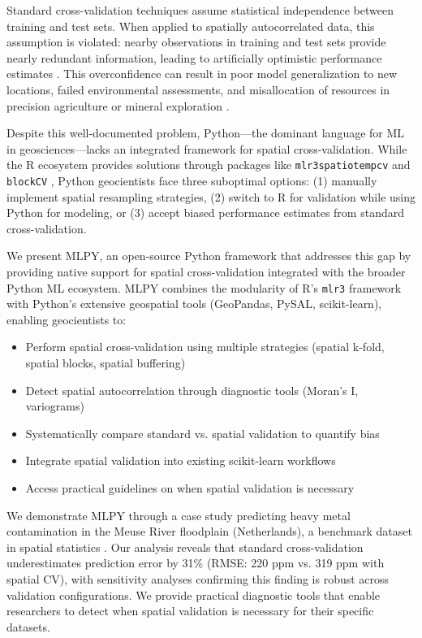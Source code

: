 \documentclass[a4paper,fleqn]{cas-sc}
\begin{document}
Standard cross-validation techniques assume statistical independence between training and test sets. When applied to spatially autocorrelated data, this assumption is violated: nearby observations in training and test sets provide nearly redundant information, leading to artificially optimistic performance estimates \citep{roberts2017cross, meyer2018improving}. This overconfidence can result in poor model generalization to new locations, failed environmental assessments, and misallocation of resources in precision agriculture or mineral exploration \citep{ploton2020spatial}.

Despite this well-documented problem, Python---the dominant language for ML in geosciences---lacks an integrated framework for spatial cross-validation. While the R ecosystem provides solutions through packages like \texttt{mlr3spatiotempcv} \citep{schratz2019hyperparameter} and \texttt{blockCV} \citep{valavi2019blockcv}, Python geocientists face three suboptimal options: (1) manually implement spatial resampling strategies, (2) switch to R for validation while using Python for modeling, or (3) accept biased performance estimates from standard cross-validation.

We present MLPY, an open-source Python framework that addresses this gap by providing native support for spatial cross-validation integrated with the broader Python ML ecosystem. MLPY combines the modularity of R's \texttt{mlr3} framework \citep{lang2019mlr3} with Python's extensive geospatial tools (GeoPandas, PySAL, scikit-learn), enabling geocientists to:

\begin{itemize}
\item Perform spatial cross-validation using multiple strategies (spatial k-fold, spatial blocks, spatial buffering)
\item Detect spatial autocorrelation through diagnostic tools (Moran's I, variograms)
\item Systematically compare standard vs. spatial validation to quantify bias
\item Integrate spatial validation into existing scikit-learn workflows
\item Access practical guidelines on when spatial validation is necessary
\end{itemize}

We demonstrate MLPY through a case study predicting heavy metal contamination in the Meuse River floodplain (Netherlands), a benchmark dataset in spatial statistics \citep{rikken1996geostatistics}. Our analysis reveals that standard cross-validation underestimates prediction error by 31\% (RMSE: 220 ppm vs. 319 ppm with spatial CV), with sensitivity analyses confirming this finding is robust across validation configurations. We provide practical diagnostic tools that enable researchers to detect when spatial validation is necessary for their specific datasets.
\end{document}
